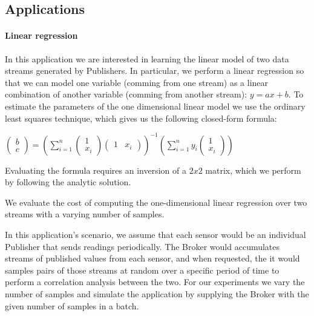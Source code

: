 \subsection{Applications}

\paragraph{Linear regression}



In this application we are interested in learning the linear model of two data
streams generated by Publishers.  In particular, we perform a linear regression
so that we can model one variable (comming from one stream) as a linear
combination of another variable (comming from another stream): $y = ax + b$.
To estimate the parameters of the one dimensional linear model we use the
ordinary least squares technique, which gives us the following closed-form
formula:

$\begin{pmatrix} b \\ c \end{pmatrix} =
\left( \displaystyle\sum_{i=1}^n \begin{pmatrix} 1 \\ x_i \end{pmatrix}
  \begin{pmatrix} 1 & x_i\end{pmatrix}\right)^{-1}
\left( \displaystyle\sum_{i=1}^n y_i \begin{pmatrix} 1 \\ x_i \end{pmatrix}\right)$

Evaluating the formula requires an inversion of a $2 x 2$ matrix, which we perform
by following the analytic solution.

We evaluate the cost of computing the one-dimensional linear regression over
two streams with a varying number of samples.

In this application's scenario, we assume that each sensor would be an
individual Publisher that sends readings periodically.  The Broker would
accumulates streams of published values from each sensor, and when requested,
the it would samples pairs of those streams at random over a specific period of
time to perform a correlation analysis between the two.  For our experiments we
vary the number of samples and simulate the application by supplying the Broker
with the given number of samples in a batch.


